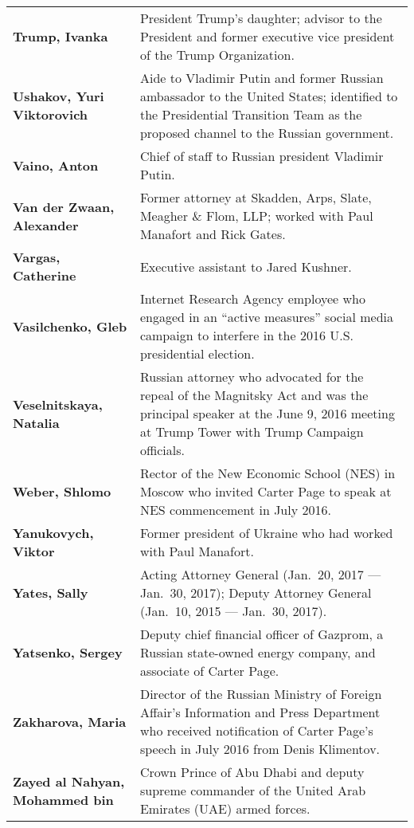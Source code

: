 \begin{longtable}{ p{} p{} }
    \textbf{Trump, Ivanka} & President Trump's daughter; advisor to the President and former executive vice president of the Trump Organization. \\

    \textbf{Ushakov, Yuri Viktorovich} & Aide to Vladimir Putin and former Russian ambassador to the United States; identified to the Presidential Transition Team as the proposed channel to the Russian government. \\

    \textbf{Vaino, Anton} & Chief of staff to Russian president Vladimir Putin. \\

    \textbf{Van der Zwaan, Alexander} & Former attorney at Skadden, Arps, Slate, Meagher \& Flom, LLP; worked with Paul Manafort and Rick Gates. \\

    \textbf{Vargas, Catherine} & Executive assistant to Jared Kushner. \\

    \textbf{Vasilchenko, Gleb} & Internet Research Agency employee who engaged in an ``active measures'' social media campaign to interfere in the 2016 U.S. presidential election. \\

    \textbf{Veselnitskaya, Natalia} & Russian attorney who advocated for the repeal of the Magnitsky Act and was the principal speaker at the June 9, 2016 meeting at Trump Tower with Trump Campaign officials. \\

    \textbf{Weber, Shlomo} & Rector of the New Economic School (NES) in Moscow who invited Carter Page to speak at NES commencement in July 2016. \\

    \textbf{Yanukovych, Viktor} & Former president of Ukraine who had worked with Paul Manafort. \\

    \textbf{Yates, Sally} & Acting Attorney General (Jan.~20, 2017 — Jan.~30, 2017); Deputy Attorney General (Jan.~10, 2015 — Jan.~30, 2017). \\

    \textbf{Yatsenko, Sergey} & Deputy chief financial officer of Gazprom, a Russian state-owned energy company, and associate of Carter Page. \\

    \textbf{Zakharova, Maria} & Director of the Russian Ministry of Foreign Affair's Information and Press Department who received notification of Carter Page's speech in July 2016 from Denis Klimentov. \\

    \textbf{Zayed al Nahyan, Mohammed bin} & Crown Prince of Abu Dhabi and deputy supreme commander of the United Arab Emirates (UAE) armed forces.

\end{longtable}

